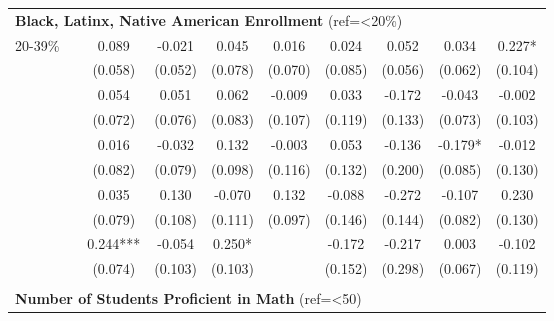 \begin{tabular*}{\linewidth}{@{\extracolsep{\fill} } llcccccccc}
\multicolumn{10}{l}{\multirow{2}{1.8in}{\textbf{Black, Latinx, Native American Enrollment} (ref=<20\%)}}\\%
&&&&&&&&&\\%
\multirow{2}{*}{\hspace{0.2cm}20{-}39\%}&&0.089&{-}0.021&0.045&0.016&0.024&0.052&0.034&0.227*\\%
&&(0.058)&(0.052)&(0.078)&(0.070)&(0.085)&(0.056)&(0.062)&(0.104)\\%
\arrayrulecolor{white}%
\hline%
\arrayrulecolor{white}%
\hline%
\arrayrulecolor{white}%
\hline%
\arrayrulecolor{white}%
\hline%
\arrayrulecolor{white}%
\hline%
\multirow{2}{*}{\hspace{0.2cm}40{-}59\%}&&0.054&0.051&0.062&{-}0.009&0.033&{-}0.172&{-}0.043&{-}0.002\\%
&&(0.072)&(0.076)&(0.083)&(0.107)&(0.119)&(0.133)&(0.073)&(0.103)\\%
\arrayrulecolor{white}%
\hline%
\arrayrulecolor{white}%
\hline%
\arrayrulecolor{white}%
\hline%
\arrayrulecolor{white}%
\hline%
\arrayrulecolor{white}%
\hline%
\multirow{2}{*}{\hspace{0.2cm}60{-}79\%}&&0.016&{-}0.032&0.132&{-}0.003&0.053&{-}0.136&{-}0.179*&{-}0.012\\%
&&(0.082)&(0.079)&(0.098)&(0.116)&(0.132)&(0.200)&(0.085)&(0.130)\\%
\arrayrulecolor{white}%
\hline%
\arrayrulecolor{white}%
\hline%
\arrayrulecolor{white}%
\hline%
\arrayrulecolor{white}%
\hline%
\arrayrulecolor{white}%
\hline%
\multirow{2}{*}{\hspace{0.2cm}80{-}89\%}&&0.035&0.130&{-}0.070&0.132&{-}0.088&{-}0.272&{-}0.107&0.230\\%
&&(0.079)&(0.108)&(0.111)&(0.097)&(0.146)&(0.144)&(0.082)&(0.130)\\%
\arrayrulecolor{white}%
\hline%
\arrayrulecolor{white}%
\hline%
\arrayrulecolor{white}%
\hline%
\arrayrulecolor{white}%
\hline%
\arrayrulecolor{white}%
\hline%
\multirow{2}{*}{\hspace{0.2cm}90\%+}&&0.244***&{-}0.054&0.250*&&{-}0.172&{-}0.217&0.003&{-}0.102\\%
&&(0.074)&(0.103)&(0.103)&&(0.152)&(0.298)&(0.067)&(0.119)\\%
\arrayrulecolor{white}%
\hline%
\arrayrulecolor{white}%
\hline%
\arrayrulecolor{white}%
\hline%
\arrayrulecolor{white}%
\hline%
\arrayrulecolor{white}%
\hline%
&&&&&&&&&\\%
\multicolumn{10}{l}{\multirow{2}{1.8in}{\textbf{Number of Students Proficient in Math} (ref=<50)}}\\%

\end{tabular*}
